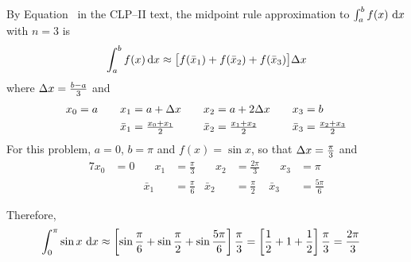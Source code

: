 \begin{solution}
By Equation~ in the CLP--II text,
the midpoint rule approximation
to $\int_a^b f(x)\ \mathrm{d}x$ with $n=3$ is
\begin{align*}
\int_a^b f(x)\,\mathrm{d}x\approx\big[f(\bar x_1)+f(\bar x_2)+f(\bar x_3)\big]\Delta x
\end{align*}
where $\Delta x = \tfrac{b-a}{3}$ and
\begin{alignat*}{7}
x_0&=a&\quad
x_1&=a+\Delta x&\quad
x_2&=a+2\Delta x&\quad
x_3&=b\\
& &
\bar x_1&=\tfrac{x_0+x_1}{2}&
\bar x_2&=\tfrac{x_1+x_2}{2}&
\bar x_3&=\tfrac{x_2+x_3}{2}
\end{alignat*}
For this problem, $a=0$, $b=\pi$ and $f(x) = \sin x$, so that
$\Delta x = \tfrac{\pi}{3}$  and
\begin{alignat*}{7}
x_0&=0&\quad
x_1&=\tfrac{\pi}{3}&\quad
x_2&=\tfrac{2\pi}{3}&\quad
x_3&=\pi\\
& &
\bar x_1&=\tfrac{\pi}{6}&
\bar x_2&=\tfrac{\pi}{2}&
\bar x_3&=\tfrac{5\pi}{6}
\end{alignat*}



  \begin{center}
  \end{center}


Therefore,
\begin{align*}
\int_0^\pi \sin x\ \mathrm{d}x
&\approx\left[\sin\frac{\pi}{6}
            +\sin \frac{\pi}{2}
            +\sin \frac{5\pi}{6}\right]\frac{\pi}{3}
=\left[\frac{1}{2}
            +1
            +\frac{1}{2}\right]\frac{\pi}{3}
=\frac{2\pi}{3}
\end{align*}

\end{solution}


